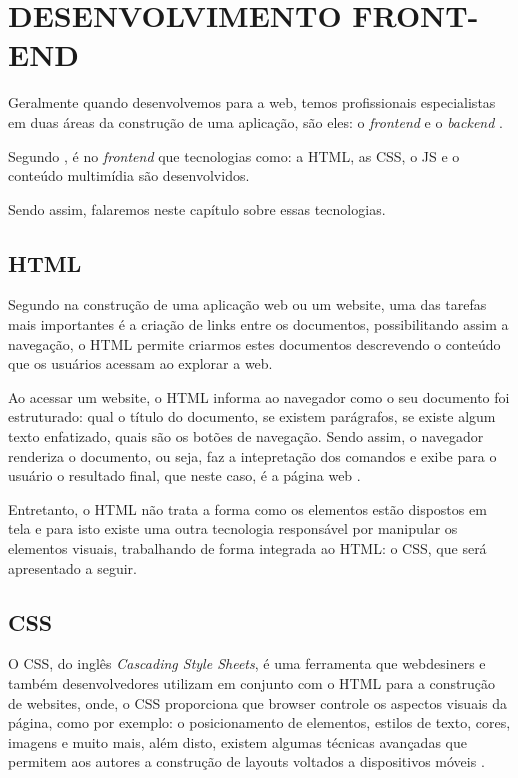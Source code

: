 \section{DESENVOLVIMENTO FRONT-END}

Geralmente quando desenvolvemos para a web, temos profissionais especialistas em
duas áreas da construção de uma aplicação, são eles: o \textit{frontend} e o
\textit{backend} \cite{artigoAvaliacaoEReducaoDoTempoDeRespostaDeSistemasWeb}.

Segundo , é no
\textit{frontend} que tecnologias como: a \ac{HTML}, as \ac{CSS}, o \ac{JS}
e o conteúdo multimídia são desenvolvidos.

Sendo assim, falaremos neste capítulo sobre essas tecnologias.

\subsection{HTML}

Segundo  na construção de uma aplicação web ou
um website, uma das tarefas mais importantes é a criação de links entre os
documentos, possibilitando assim a navegação, o \acs{HTML} permite criarmos
estes documentos descrevendo o conteúdo que os usuários acessam ao explorar a web.

Ao acessar um website, o \acs{HTML} informa ao navegador como o seu documento
foi estruturado: qual o título do documento, se existem parágrafos, se existe
algum texto enfatizado, quais são os botões de navegação. Sendo assim, o
navegador renderiza o documento, ou seja, faz a intepretação dos
comandos e exibe para o usuário o resultado final, que neste caso, é a página
web \cite{headFirstHTMLWithCSSAndXHTML}.

Entretanto, o \acs{HTML} não trata a forma como os elementos estão dispostos em
tela e para isto existe uma outra tecnologia responsável por manipular os
elementos visuais, trabalhando de forma integrada ao \acs{HTML}:
o \acs{CSS}, que será apresentado a seguir.

\subsection{CSS}

O \ac{CSS}, do inglês \textit{Cascading Style Sheets}, é uma ferramenta
que webdesiners e também desenvolvedores utilizam em conjunto com o \ac{HTML}
para a construção de websites, onde, o \acs{CSS} proporciona que \ac{browser}
controle os aspectos visuais da página, como por exemplo: o posicionamento de elementos,
estilos de texto, cores, imagens e muito mais, além disto, existem algumas
técnicas avançadas que permitem aos autores a construção de layouts voltados a
dispositivos móveis \cite{beginningCSSCascadingStyleSheetsForWebDesign}.

